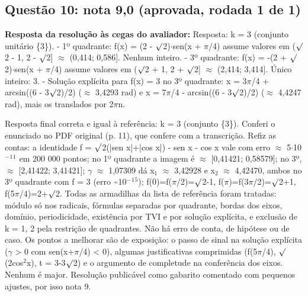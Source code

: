 \documentclass{article}%
\begin{document}
\subsection*{Questão 10: nota 9,0 (aprovada, rodada 1 de 1)}%
\textbf{Resposta da resolução às cegas do avaliador:} Resposta: k = 3 (conjunto unitário \{3\}).\newline%
\newline%
{-} 1º quadrante: f(x) = (2 - $\surd$2)$\cdot$sen(x + $\pi$/4) assume valores em ($\surd$2 - 1, 2 - $\surd$2{]} $\approx$ (0,414; 0,586{]}. Nenhum inteiro.\newline%
{-} 3º quadrante: f(x) = -(2 + $\surd$2)$\cdot$sen(x + $\pi$/4) assume valores em ($\surd$2 + 1, 2 + $\surd$2{]} $\approx$ (2,414; 3,414{]}. Único inteiro: 3.\newline%
{-} Solução explícita para f(x) = 3 no 3º quadrante: x = 3$\pi$/4 + arcsin((6 - 3$\surd$2)/2) ($\approx$ 3,4293 rad) e x = 7$\pi$/4 - arcsin((6 - 3$\surd$2)/2) ($\approx$ 4,4247 rad), mais os translados por 2$\pi$n.\par %
Resposta final correta e igual à referência: k = 3 (conjunto \{3\}). Conferi o enunciado no PDF original (p. 11), que confere com a transcrição. Refiz as contas: a identidade f = $\surd$2(|sen x|+|cos x|) - sen x - cos x vale com erro $\approx$ 5$\cdot$10$^{-}$$^{1}$$^{1}$ em 200 000 pontos; no 1º quadrante a imagem é $\approx$ {[}0,41421; 0,58579{]}; no 3º, $\approx$ {[}2,41422; 3,41421{]}; $\gamma$ $\approx$ 1,07309 dá x$_{1}$ $\approx$ 3,42928 e x$_{2}$ $\approx$ 4,42470, ambos no 3º quadrante com f = 3 (erro \textasciitilde{}10$^{-}$$^{1}$$^{5}$); f(0)=f($\pi$/2)=$\surd$2-1, f($\pi$)=f(3$\pi$/2)=$\surd$2+1, f(5$\pi$/4)=2+$\surd$2. Todas as armadilhas da lista de referência foram tratadas: módulo só nos radicais, fórmulas separadas por quadrante, bordas dos eixos, domínio, periodicidade, existência por TVI e por solução explícita, e exclusão de k = 1, 2 pela restrição de quadrantes. Não há erro de conta, de hipótese ou de caso. Os pontos a melhorar são de exposição: o passo de sinal na solução explícita ($\gamma$ > 0 com sen(x+$\pi$/4) < 0), algumas justificativas comprimidas (f(5$\pi$/4), $\surd$(2cos$^2$x), t = 3-3$\surd$2) e o argumento de completude na conferência dos eixos. Nenhum é major. Resolução publicável como gabarito comentado com pequenos ajustes, por isso nota 9.%
\end{document}
